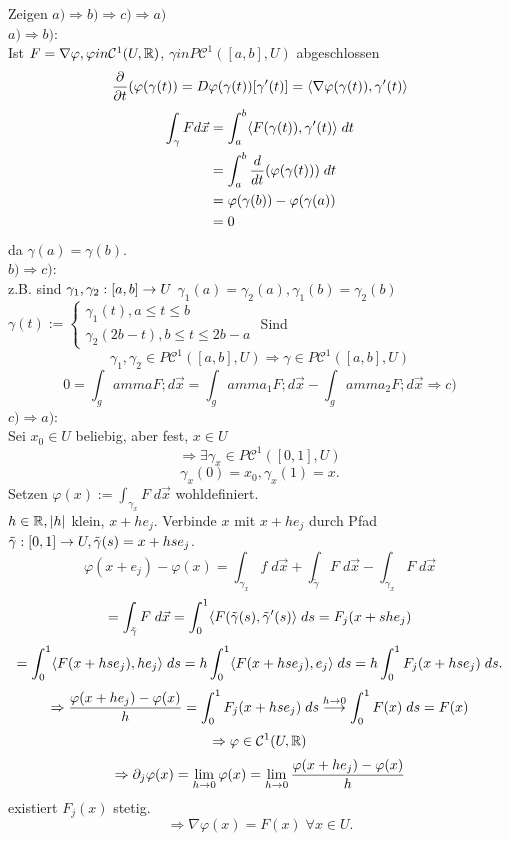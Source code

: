 \documentclass[../ana2.tex]{subfiles}
\begin{document}
\begin{bew}
    Zeigen \(a) \Rightarrow b) \Rightarrow c) \Rightarrow a) \)\\
    \(a) \Rightarrow b) \):\\
    Ist \(F = \nabla \varphi, \varphi in \mathcal{C}^1(U,\R)\),
    \(\gamma in P \mathcal{C}^1([a,b], U)\) abgeschlossen
    \[ \ddxpartial{t}(\varphi(\gamma(t)) = D\varphi(\gamma(t))[\gamma'(t)]
    = \scalarprod{\nabla \varphi(\gamma(t))}{\gamma'(t)} \]
    \begin{align*}
        \int_\gamma F d \vec{x} &= \integralx{\scalarprod{F(\gamma(t))}{\gamma'(t)}}{a}{b}{t}\\
        &= \integralx{\ddx{t}(\varphi(\gamma(t)))}{a}{b}{t}\\
        &= \varphi(\gamma(b)) - \varphi(\gamma(a))\\
        &= 0
    \end{align*}
    da \(\gamma(a) = \gamma(b)\).\\    
    \(b) \Rightarrow c) \):\\
    z.B. sind \(\abb{\gamma_1, \gamma_2}{[a,b]}{U} \)
    \(\gamma_1(a) = \gamma_2(a), \gamma_1(b) = \gamma_2(b)\)
    \(\gamma(t) := \begin{cases}
        \gamma_1(t), a \leq t \leq b\\
    \gamma_2(2b - t), b \leq t \leq 2b - a 
    \end{cases} \)    
    Sind \[\gamma_1, \gamma_2 \in P \mathcal{C}^1([a,b], U)
    \Rightarrow \gamma \in P \mathcal{C}^1([a,b], U)\]
    \[0 = \int_gamma F ; d\vec{x} = \int_gamma_1 F ; d\vec{x} - \int_gamma_2 F ; d\vec{x} 
    \Rightarrow c)\]    
    \(c) \Rightarrow a)\):\\
     Sei \( x_0 \in U \) beliebig, aber fest, \( x \in U \)
    \[ \Rightarrow \exists \gamma_x \in P \mathcal{C}^1([0,1], U) \]
    \[ \gamma_x(0) = x_0, \gamma_x(1) = x. \]
    Setzen \( \varphi(x) := \int_{\gamma_x} F \; d\vec{x} \) 
    wohldefiniert.\\
    \( h \in \R, \abs{h} \) klein, \( x + h e_j \).
    Verbinde \( x \) mit \( x + h e_j \) durch Pfad \( \abb{\tilde{\gamma}}{[0,1]}{U}, 
    \tilde{\gamma}(s) = x + h s e_j \).
    \[ \varphi(x + e_j) - \varphi(x) 
    = \int_{\gamma_x} f \; d\vec{x} + \int_{\tilde{\gamma}} F \; d\vec{x} - \int_{\gamma_x} F \; d \vec{x} \]
    \[ = \int_{\tilde{\gamma}} F \; d\vec{x} 
    = \integralx{\scalarprod{ F(\tilde{\gamma}(s) }{ \tilde{\gamma}'(s) }}{0}{1}{s} 
    = F_j (x+sh e_j) \]
    \[ = \integralx{\scalarprod{F(x + h s e_j)}{ h e_j }}{0}{1}{s} 
    = h \integralx{ \scalarprod{ F(x + h s e_j) }{ e_j } }{0}{1}{s} 
    = h \integralx{F_j (x + hs e_j)}{0}{1}{s}. \]
    \[ \Rightarrow \frac{ \varphi(x + h e_j) - \varphi(x) }{h} 
    = \integralx{F_j(x+hse_j)}{0}{1}{s}  \overset{h \rightarrow 0}{\longrightarrow} 
    \integralx{F(x)}{0}{1}{s} 
    = F(x) \]
    \[ \Rightarrow \varphi \in \mathcal{C}^1 (U, \R) \]
    \[ \Rightarrow \partial_j \varphi(x) = \limesx{h}{0} \varphi(x) 
    = \limesx{h}{0} \frac{\varphi(x + he_j) - \varphi(x)}{h} \]
    existiert \(F_j(x)\) stetig.
    \[ \Rightarrow \nabla \varphi(x) = F(x) \;\forall x \in U. \]
\end{bew}
\end{document}
